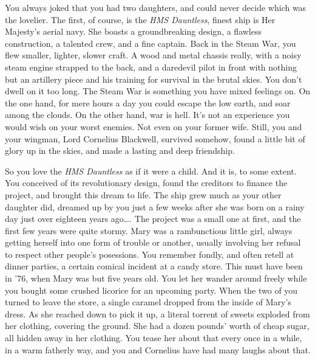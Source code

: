 \documentclass[char]{airship}
\begin{document}
\name{\cCaptain{}}


You always joked that you had two daughters, and could never decide
which was the lovelier. The first, of course, is the {\it HMS
Dauntless}, finest ship is Her Majesty's aerial navy. She boasts a
groundbreaking design, a flawless construction, a talented crew, and a
fine captain. Back in the Steam War, you flew smaller, lighter, slower
craft. A wood and metal chassis really, with a noisy steam engine
strapped to the back, and a daredevil pilot in front with nothing but
an artillery piece and his training for survival in the brutal
skies. You don't dwell on it too long. The Steam War is something you
have mixed feelings on. On the one hand, for mere hours a day you
could escape the low earth, and soar among the clouds. On the other
hand, war is hell. It's not an experience you would wish on your worst
enemies. Not even on your former wife. Still, you and your wingman,
Lord Cornelius Blackwell, survived somehow, found a little bit of
glory up in the skies, and made a lasting and deep friendship.

So you love the {\it HMS Dauntless} as if it were a child. And it is,
to some extent. You conceived of its revolutionary design, found the
creditors to finance the project, and brought this dream to life. The
ship grew much as your other daughter did, dreamed up by you just a
few weeks after she was born on a rainy day just over eighteen years
ago{\ldots}. The project was a small one at first, and the first few
years were quite stormy. Mary was a rambunctious little girl, always
getting herself into one form of trouble or another, usually involving
her refusal to respect other people's posessions. You remember fondly,
and often retell at dinner parties, a certain comical incident at a
candy store. This must have been in '76, when Mary was but five years
old. You let her wander around freely while you bought some crushed
licorice for an upcoming party. When the two of you turned to leave
the store, a single caramel dropped from the inside of Mary's
dress. As she reached down to pick it up, a literal torrent of sweets
exploded from her clothing, covering the ground. She had a dozen
pounds' worth of cheap sugar, all hidden away in her clothing. You
tease her about that every once in a while, in a warm fatherly way,
and you and Cornelius have had many laughs about that.
\end{document}
